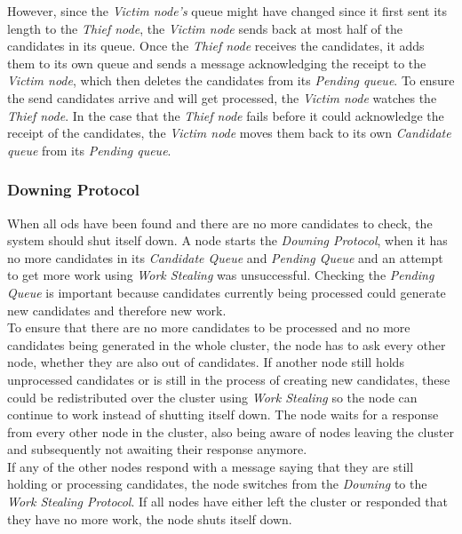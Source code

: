 However, since the \emph{Victim node's} queue might have changed since it first sent its length to the \emph{Thief node}, the \emph{Victim node} sends back at most half of the candidates in its queue.
Once the \emph{Thief node} receives the candidates, it adds them to its own queue and sends a message acknowledging the receipt to the \emph{Victim node}, which then deletes the candidates from its \emph{Pending queue}. 
To ensure the send candidates arrive and will get processed, the \emph{Victim node} watches the \emph{Thief node}.
In the case that the \emph{Thief node} fails before it could acknowledge the receipt of the candidates, the \emph{Victim node} moves them back to its own \emph{Candidate queue} from its \emph{Pending queue}.
 
\subsubsection{Downing Protocol}\label{protocol:downing}
When all \glspl{od} have been found and there are no more candidates to check, the system should shut itself down.
A node starts the \emph{Downing Protocol}, when it has no more candidates in its \emph{Candidate Queue} and \emph{Pending Queue} and an attempt to get more work using \emph{Work Stealing} was unsuccessful.
Checking the \emph{Pending Queue} is important because candidates currently being processed could generate new candidates and therefore new work.\\
To ensure that there are no more candidates to be processed and no more candidates being generated in the whole cluster, the node has to ask every other node, whether they are also out of candidates.
If another node still holds unprocessed candidates or is still in the process of creating new candidates, these could be redistributed over the cluster using \emph{Work Stealing} so the node can continue to work instead of shutting itself down.
The node waits for a response from every other node in the cluster, also being aware of nodes leaving the cluster and subsequently not awaiting their response anymore.\\
If any of the other nodes respond with a message saying that they are still holding or processing candidates, the node switches from the \emph{Downing} to the \emph{Work Stealing Protocol}.
If all nodes have either left the cluster or responded that they have no more work, the node shuts itself down.

